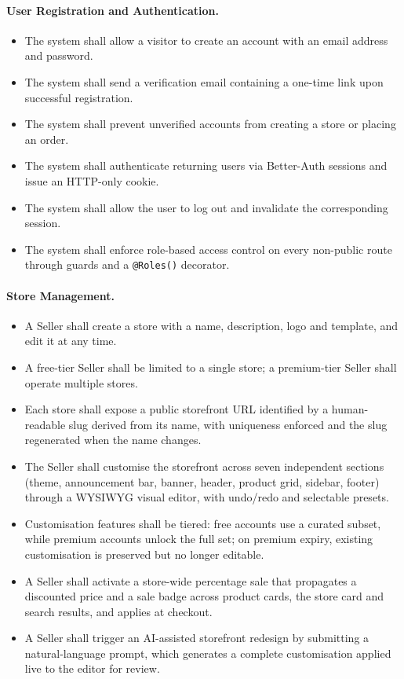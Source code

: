 \paragraph{User Registration and Authentication.}
\begin{itemize}[leftmargin=*,itemsep=1pt]
  \item The system shall allow a visitor to create an account with an
        email address and password.
  \item The system shall send a verification email containing a one-time
        link upon successful registration.
  \item The system shall prevent unverified accounts from creating a
        store or placing an order.
  \item The system shall authenticate returning users via Better-Auth
        sessions and issue an HTTP-only cookie.
  \item The system shall allow the user to log out and invalidate the
        corresponding session.
  \item The system shall enforce role-based access control on every
        non-public route through guards and a \texttt{@Roles()}
        decorator.
\end{itemize}

\paragraph{Store Management.}
\begin{itemize}[leftmargin=*,itemsep=1pt]
  \item A Seller shall create a store with a name, description, logo and
        template, and edit it at any time.
  \item A free-tier Seller shall be limited to a single store; a
        premium-tier Seller shall operate multiple stores.
  \item Each store shall expose a public storefront URL identified by a
        human-readable slug derived from its name, with uniqueness
        enforced and the slug regenerated when the name changes.
  \item The Seller shall customise the storefront across seven
        independent sections (theme, announcement bar, banner, header,
        product grid, sidebar, footer) through a WYSIWYG visual editor,
        with undo/redo and selectable presets.
  \item Customisation features shall be tiered: free accounts use a
        curated subset, while premium accounts unlock the full set; on
        premium expiry, existing customisation is preserved but no
        longer editable.
  \item A Seller shall activate a store-wide percentage sale that
        propagates a discounted price and a sale badge across product
        cards, the store card and search results, and applies at
        checkout.
  \item A Seller shall trigger an AI-assisted storefront redesign by
        submitting a natural-language prompt, which generates a complete
        customisation applied live to the editor for review.
\end{itemize}


